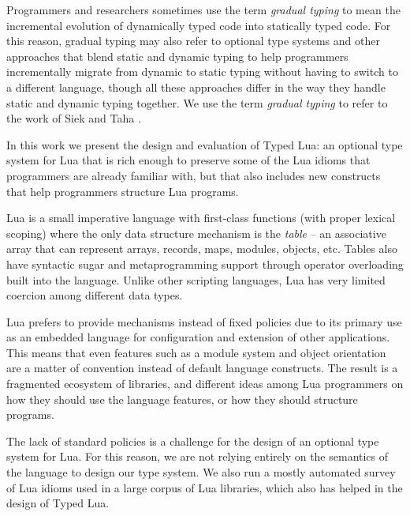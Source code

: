 Programmers and researchers sometimes use the term \emph{gradual typing}
to mean the incremental evolution of dynamically typed code into
statically typed code.
For this reason, gradual typing may also refer to optional type
systems and other approaches that blend static and dynamic typing to
help programmers incrementally migrate from dynamic to static typing
without having to switch to a different language, though all these
approaches differ in the way they handle static and dynamic typing
together.
We use the term \emph{gradual typing} to refer to the work of
Siek and Taha \cite{siek2006gradual}.

In this work we present the design and evaluation of Typed Lua:
an optional type system for Lua that is rich enough to
preserve some of the Lua idioms that programmers are already familiar with,
but that also includes new constructs that help programmers
structure Lua programs.

Lua is a small imperative language with first-class functions
(with proper lexical scoping) where the only data structure
mechanism is the \emph{table} --
an associative array that can represent arrays, records, maps, modules, objects, etc.
Tables also have syntactic sugar and metaprogramming support
through operator overloading built into the language.
Unlike other scripting languages, Lua has very limited coercion
among different data types.

Lua prefers to provide mechanisms instead of fixed policies due
to its primary use as an embedded language for configuration and
extension of other applications.
This means that even features such as a module system and
object orientation are a matter of convention instead of default
language constructs.
The result is a fragmented ecosystem of libraries, and different
ideas among Lua programmers on how they should use the language
features, or how they should structure programs.

The lack of standard policies is a challenge for the design of
an optional type system for Lua.
For this reason, we are not relying entirely on the semantics of
the language to design our type system.
We also run a mostly automated survey of Lua idioms used in a
large corpus of Lua libraries, which also has helped in the design of Typed Lua.

